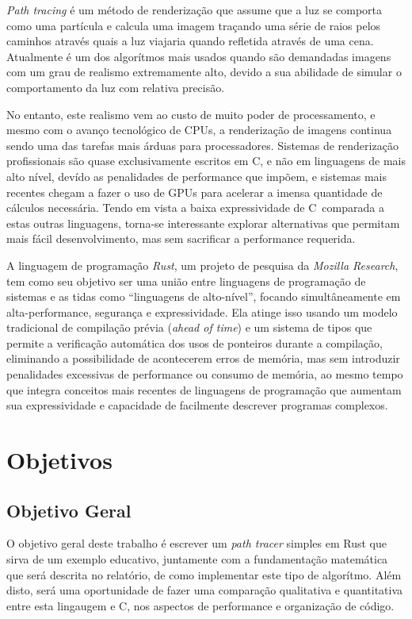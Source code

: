 \documentclass[12pt]{article}
\def\Cpp{{C\nolinebreak[4]\raisebox{.20ex}{\small\bf++}}}
\begin{document}
\emph{Path tracing} é um método de renderização que assume que a luz se comporta como uma partícula e calcula uma imagem traçando uma série de raios pelos caminhos através quais a luz viajaria quando refletida através de uma cena. Atualmente é um dos algorítmos mais usados quando são demandadas imagens com um grau de realismo extremamente alto, devido a sua abilidade de simular o comportamento da luz com relativa precisão.

No entanto, este realismo vem ao custo de muito poder de processamento, e mesmo com o avanço tecnológico de CPUs, a renderização de imagens continua sendo uma das tarefas mais árduas para processadores. Sistemas de renderização profissionais são quase exclusivamente escritos em \Cpp, e não em linguagens de mais alto nível, devído as penalidades de performance que impõem, e sistemas mais recentes chegam a fazer o uso de GPUs para acelerar a imensa quantidade de cálculos necessária. Tendo em vista a baixa expressividade de \Cpp\ comparada a estas outras linguagens, torna-se interessante explorar alternativas que permitam mais fácil desenvolvimento, mas sem sacrificar a performance requerida.

A linguagem de programação \emph{Rust}, um projeto de pesquisa da \emph{Mozilla Research}, tem como seu objetivo ser uma união entre linguagens de programação de sistemas e as tidas como ``linguagens de alto-nível'', focando simultâneamente em alta-performance, segurança e expressividade. Ela atinge isso usando um modelo tradicional de compilação prévia (\emph{ahead of time}) e um sistema de tipos que permite a verificação automática dos usos de ponteiros durante a compilação, eliminando a possibilidade de acontecerem erros de memória, mas sem introduzir penalidades excessivas de performance ou consumo de memória, ao mesmo tempo que integra conceitos mais recentes de linguagens de programação que aumentam sua expressividade e capacidade de facilmente descrever programas complexos.

\section{Objetivos}

\subsection{Objetivo Geral}

O objetivo geral deste trabalho é escrever um \emph{path tracer} simples em Rust que sirva de um exemplo educativo, juntamente com a fundamentação matemática que será descrita no relatório, de como implementar este tipo de algorítmo. Além disto, será uma oportunidade de fazer uma comparação qualitativa e quantitativa entre esta lingaugem e \Cpp, nos aspectos de performance e organização de código.
\end{document}
